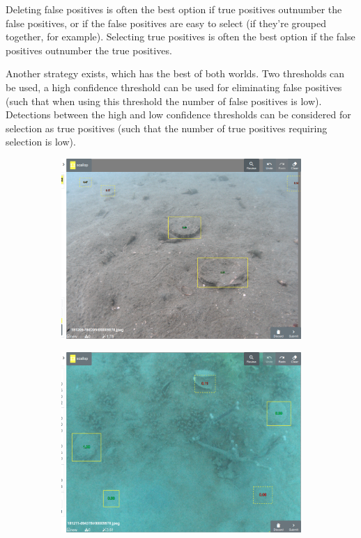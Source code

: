 Deleting false positives is often the best option if true positives outnumber the false positives, or if the false positives are easy to select (if they're grouped together, for example). Selecting true positives is often the best option if the false positives outnumber the true positives. 

Another strategy exists, which has the best of both worlds. Two thresholds can be used, a high confidence threshold can be used for eliminating false positives (such that when using this threshold the number of false positives is low). Detections between the high and low confidence thresholds can be considered for selection as true positives (such that the number of true positives requiring selection is low).


\begin{figure}[h]
\centering
\begin{subfigure}[t]{0.5\linewidth}
  \includegraphics[width=1.0\linewidth]{figures/annotation/scallop/review_mode.png}
  \caption{}
\end{subfigure}%
\begin{subfigure}[t]{0.5\linewidth}
  \includegraphics[width=1.0\linewidth]{figures/annotation/scallop/false_positive.png}

\end{subfigure}
\end{figure}
